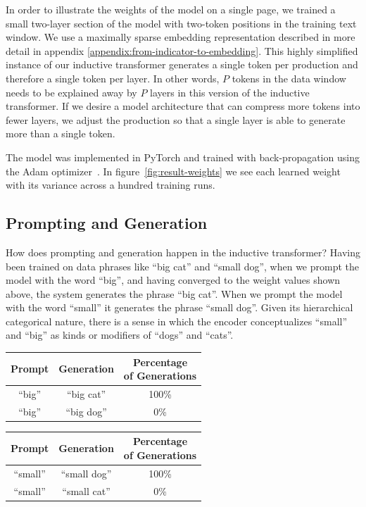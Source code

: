 \documentclass{article}
\begin{document}
In order to illustrate the weights of the model on a single page, we trained a small two-layer section of the model with two-token positions in the training text window.  We use a maximally sparse embedding representation described in more detail in appendix \ref{appendix:from-indicator-to-embedding}.  This highly simplified instance of our inductive transformer generates a single token per production and therefore a single token per layer. In other words, $P$ tokens in the data window needs to be explained away by $P$ layers in this version of the inductive transformer.  If we desire a model architecture that can compress more tokens into fewer layers, we adjust the production so that a single layer is able to generate more than a single token.

The model was implemented in PyTorch and trained with back-propagation using the Adam optimizer~\citep{NEURIPS2019_9015, kingma2017adam}.  In figure~\ref{fig:result-weights} we see each learned weight with its variance across a hundred training runs.

\subsection{Prompting and Generation}

How does prompting and generation happen in the inductive transformer?  Having been trained on data phrases like ``big cat'' and ``small dog'', when we prompt the model with the word ``big'', and having converged to the weight values shown above, the system generates the phrase ``big cat''.  When we prompt the model with the word ``small'' it generates the phrase ``small dog''.  Given its hierarchical categorical nature, there is a sense in which the encoder conceptualizes ``small'' and ``big'' as kinds or modifiers of ``dogs'' and ``cats''.

\begin{tabular}{ccc}
\hline\hline
Prompt & Generation &  \thead{Percentage \\ of Generations} \\[1ex]
\hline\hline
``big'' & ``big cat'' & 100\% \\
``big'' & ``big dog'' & 0\% \\
\hline
\end{tabular}
\quad\quad\quad
\begin{tabular}{ccc}
\hline\hline
Prompt & Generation &  \thead{Percentage \\ of Generations} \\[1ex]
\hline
``small'' & ``small dog'' & 100\% \\
``small'' & ``small cat'' & 0\% \\
\hline
\end{tabular}
\end{document}

